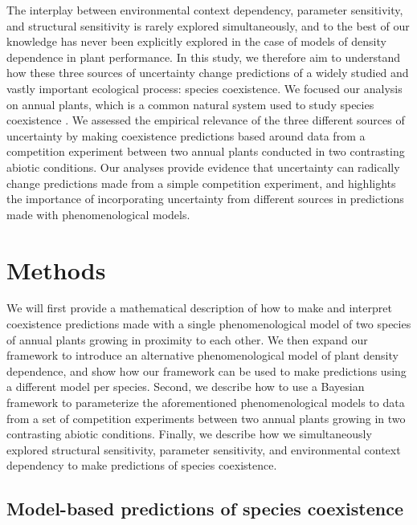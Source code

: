 The interplay between environmental context dependency, parameter sensitivity, and structural sensitivity is rarely explored simultaneously, and to the best of our knowledge  has never been explicitly explored in the case of models of density dependence in plant performance. In this study, we therefore aim to understand how these three sources of uncertainty change predictions of a widely studied and vastly important ecological process: species coexistence. We focused our analysis on annual plants, which is a common natural system used to study species coexistence \citep{mayfield2017higher, godoy_phenology_2014,levine2009importance, zepeda2019fluctuation}. We assessed the empirical relevance of the three different sources of uncertainty by making coexistence predictions based around data from a competition experiment between two annual plants conducted in two contrasting abiotic conditions. Our analyses provide evidence that uncertainty can radically change predictions made from a simple competition experiment, and highlights the importance of incorporating uncertainty from different sources in predictions made with phenomenological models.

\section*{Methods}

We will first provide a mathematical description of how to make and interpret coexistence predictions made with a single phenomenological model of two species of annual plants growing in proximity to each other. We then expand our framework to introduce an alternative phenomenological model of plant density dependence, and show how our framework can be used to make predictions using a different model per species. Second, we describe how to use a Bayesian framework to parameterize the  aforementioned  phenomenological models  to data from a set of competition experiments between two annual plants growing in two contrasting abiotic conditions. Finally, we describe how we simultaneously explored structural sensitivity, parameter sensitivity, and environmental context dependency to make predictions of species coexistence.


\subsection*{Model-based predictions of species coexistence }

